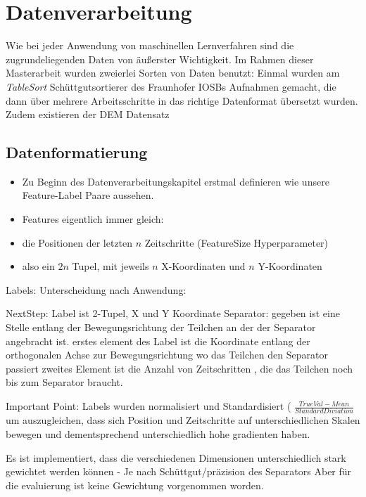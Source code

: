 \chapter{Datenverarbeitung}

Wie bei jeder Anwendung von maschinellen Lernverfahren sind die zugrundeliegenden Daten von äußerster Wichtigkeit.
Im Rahmen dieser Masterarbeit wurden zweierlei Sorten von Daten benutzt:
Einmal wurden am \textit{TableSort} Schüttgutsortierer des Fraunhofer IOSBs Aufnahmen gemacht, 
die dann über mehrere Arbeitsschritte in das richtige Datenformat übersetzt wurden.
Zudem existieren der DEM Datensatz 



\section{Datenformatierung}


\begin{itemize}
	\item Zu Beginn des Datenverarbeitungskapitel erstmal definieren wie unsere Feature-Label Paare aussehen.
	\item Features eigentlich immer gleich:
	\item die Positionen der letzten \(n\) Zeitschritte (FeatureSize Hyperparameter)
	\item also ein \(2n\) Tupel, mit jeweils \(n\) X-Koordinaten und \(n\) Y-Koordinaten

\end{itemize}


Labels: Unterscheidung nach Anwendung:

NextStep: Label ist 2-Tupel, X und Y Koordinate
Separator: 
	gegeben ist eine Stelle entlang der Bewegungsrichtung der Teilchen an der der Separator angebracht ist.
	erstes element des Label ist die Koordinate entlang der orthogonalen Achse zur Bewegungsrichtung wo das Teilchen den Separator passiert
	zweites Element ist die Anzahl von Zeitschritten , die das Teilchen noch bis zum Separator braucht.

Important Point: Labels wurden normalisiert und Standardisiert ( \(\frac{TrueVal - Mean}{Standard Diviation}\)
um auszugleichen, dass sich Position und Zeitschritte auf unterschiedlichen Skalen bewegen und dementsprechend unterschiedlich hohe gradienten haben.


Es ist implementiert, dass die verschiedenen Dimensionen unterschiedlich stark gewichtet werden können - Je nach Schüttgut/präzision des Separators
Aber für die evaluierung ist keine Gewichtung vorgenommen worden.

